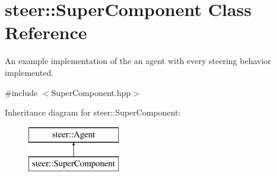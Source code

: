\hypertarget{classsteer_1_1_super_component}{\section{steer\-:\-:Super\-Component Class Reference}
\label{classsteer_1_1_super_component}
}


An example implementation of the an agent with every steering behavior implemented.  




{\ttfamily \#include $<$Super\-Component.\-hpp$>$}

Inheritance diagram for steer\-:\-:Super\-Component\-:\begin{figure}[H]
\begin{center}
\leavevmode
\includegraphics[height=2.000000cm]{classsteer_1_1_super_component}
\end{center}
\end{figure}
